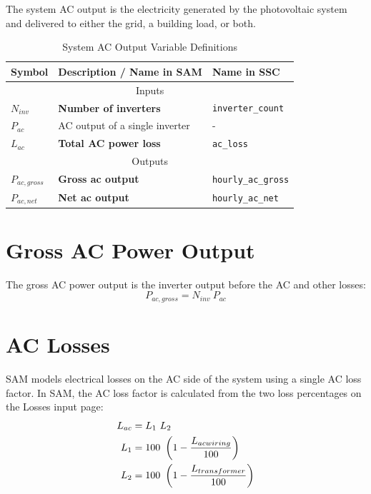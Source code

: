 \documentclass[12pt,letterpaper]{article}
\begin{document}
The system AC output is the electricity generated by the photovoltaic system and delivered to either the grid, a building load, or both.
\begin{table}
\begin{center}
\caption{System AC Output Variable Definitions}
\begin{tabular}{lll}
\midrule
Symbol & Description / \textbf{Name in SAM} & Name in SSC \\
\midrule
\multicolumn{3}{c}{Inputs}\\
$N_{inv}$ & \textbf{Number of inverters} & \texttt{inverter\_count} \\
$P_{ac}$ & AC output of a single inverter & - \\
$L_{ac}$ & \textbf{Total AC power loss} & \texttt{ac\_loss} \\
\midrule
\multicolumn{3}{c}{Outputs}\\
$P_{ac,gross}$ & \textbf{Gross ac output} & \texttt{hourly\_ac\_gross} \\
$P_{ac,net}$ & \textbf{Net ac output} & \texttt{hourly\_ac\_net} \\
\hline
\end{tabular}
\label{tab-systemacoutputvars}
\end{center}
\end{table}

\section{Gross AC Power Output}

The gross AC power output is the inverter output before the AC and other losses:
\begin{equation}
P_{ac,gross}= N_{inv}~P_{ac}
\end{equation}

\section{AC Losses}\label{sec-aclosses}

SAM models electrical losses on the AC side of the system using a single AC loss factor.  In SAM, the AC loss factor is calculated from the two loss percentages on the Losses input page:
\begin{align}\label{eqn-acderate}
L_{ac} &= L_1~L_2\notag\\
L_{1} &= 100~\left(1-\frac{L_{acwiring}}{100}\right) \notag\\
L_{2} &= 100~\left(1-\frac{L_{transformer}}{100}\right)
\end{align}
\end{document}
